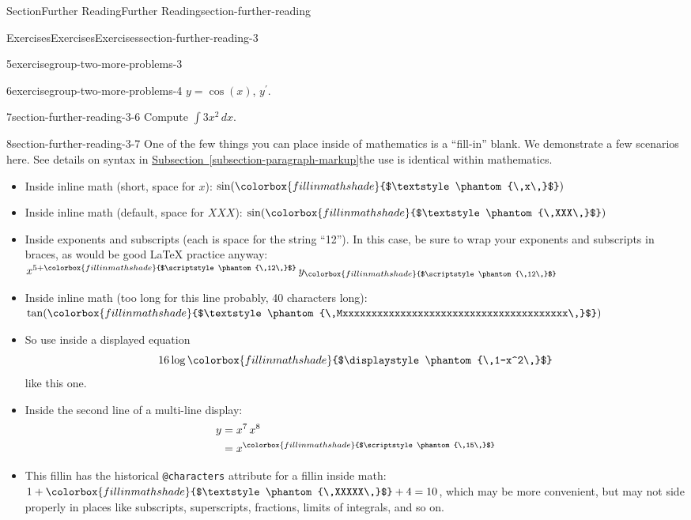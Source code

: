 \documentclass[twoside,10pt,]{article}
\newcommand{\xreffont}{\relax}
\newcommand{\mono}[1]{\texttt{#1}}
\newcommand{\fillinmath}[1]{\mathchoice{\colorbox{fillinmathshade}{$\displaystyle     \phantom{\,#1\,}$}}{\colorbox{fillinmathshade}{$\textstyle        \phantom{\,#1\,}$}}{\colorbox{fillinmathshade}{$\scriptstyle      \phantom{\,#1\,}$}}{\colorbox{fillinmathshade}{$\scriptscriptstyle\phantom{\,#1\,}$}}}
\numberwithin{equation}{section}
\begin{document}
\begin{sectionptx}{Section}{Further Reading}{}{Further Reading}{}{}{section-further-reading}
\begin{exercises-subsection}{Exercises}{Exercises}{}{Exercises}{}{}{section-further-reading-3}
\begin{exercisegroup}
\begin{divisionexerciseeg}{5}{}{}{exercisegroup-two-more-problems-3}
\end{divisionexerciseeg}%
\begin{divisionexerciseeg}{6}{}{}{exercisegroup-two-more-problems-4}%
\(y = \cos(x)\), \(y^\prime\).%
\end{divisionexerciseeg}%
\end{exercisegroup}
\par\medskip\noindent
\begin{divisionexercise}{7}{}{}{section-further-reading-3-6}%
Compute \(\int 3x^2\,dx\).%
\end{divisionexercise}%
\begin{divisionexercise}{8}{}{}{section-further-reading-3-7}%
One of the few things you can place inside of mathematics is a ``fill-in'' blank.  We demonstrate a few scenarios here.  See details on syntax in \hyperref[subsection-paragraph-markup]{Subsection~{\xreffont\ref{subsection-paragraph-markup}}}\textendash{}the use is identical within mathematics.%
\begin{itemize}[label=\textbullet]
\item{}Inside inline math (short, space for \(x\)): \(\sin(\fillinmath{x})\)%
\item{}Inside inline math (default, space for \(XXX\)): \(\sin(\fillinmath{XXX})\)%
\item{}Inside exponents and subscripts (each is space for the string ``12'').  In this case, be sure to wrap your exponents and subscripts in braces, as would be good \LaTeX{} practice anyway: \(x^{5+\fillinmath{12}}\,y_{\fillinmath{12}}\)%
\item{}Inside inline math (too long for this line probably, 40 characters long): \(\tan(\fillinmath{Mxxxxxxxxxxxxxxxxxxxxxxxxxxxxxxxxxxxxxxx})\)%
\item{}So use inside a displayed equation%
\begin{equation*}
16\log\space\fillinmath{1-x^2}
\end{equation*}
like this one.%
\item{}Inside the second line of a multi-line display:%
\begin{align*}
y &= x^7\,x^8\\
&= x^{\fillinmath{15}}
\end{align*}
%
\item{}This fillin has the historical \mono{@characters} attribute for a fillin inside math: \(1+\fillinmath{XXXXX}+4=10\), which may be more convenient, but may not side properly in places like subscripts, superscripts, fractions, limits of integrals, and so on.%

\end{itemize}
\end{divisionexercise}
\end{exercises-subsection}
\end{sectionptx}
\end{document}
